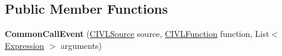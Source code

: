 \subsection*{Public Member Functions}
\begin{DoxyCompactItemize}
\item 
\hypertarget{classedu_1_1udel_1_1cis_1_1vsl_1_1civl_1_1model_1_1common_1_1contract_1_1CommonCallEvent_a554b3b74c9c37599385734883ff377fa}{}{\bfseries Common\+Call\+Event} (\hyperlink{interfaceedu_1_1udel_1_1cis_1_1vsl_1_1civl_1_1model_1_1IF_1_1CIVLSource}{C\+I\+V\+L\+Source} source, \hyperlink{interfaceedu_1_1udel_1_1cis_1_1vsl_1_1civl_1_1model_1_1IF_1_1CIVLFunction}{C\+I\+V\+L\+Function} function, List$<$ \hyperlink{interfaceedu_1_1udel_1_1cis_1_1vsl_1_1civl_1_1model_1_1IF_1_1expression_1_1Expression}{Expression} $>$ arguments)\label{classedu_1_1udel_1_1cis_1_1vsl_1_1civl_1_1model_1_1common_1_1contract_1_1CommonCallEvent_a554b3b74c9c37599385734883ff377fa}


\end{DoxyCompactItemize}
